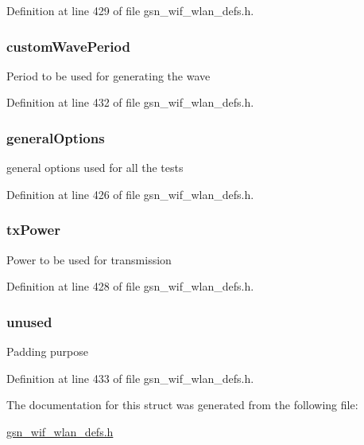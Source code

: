 Definition at line 429 of file gsn\_\-wif\_\-wlan\_\-defs.h.

\hypertarget{a00185_ac31de4bff9a4d75b56974c870ee58fd5}{
\subsubsection[{customWavePeriod}]{ {\bf customWavePeriod}}}
\label{a00185_ac31de4bff9a4d75b56974c870ee58fd5}
Period to be used for generating the wave 

Definition at line 432 of file gsn\_\-wif\_\-wlan\_\-defs.h.

\hypertarget{a00185_a5e4e9e8d2b76fbb6bdf201c4aeddd60d}{
\subsubsection[{generalOptions}]{ {\bf generalOptions}}}
\label{a00185_a5e4e9e8d2b76fbb6bdf201c4aeddd60d}
general options used for all the tests 

Definition at line 426 of file gsn\_\-wif\_\-wlan\_\-defs.h.

\hypertarget{a00185_a763a8a049f451428e05835d3c3b466cd}{
\subsubsection[{txPower}]{ {\bf txPower}}}
\label{a00185_a763a8a049f451428e05835d3c3b466cd}
Power to be used for transmission 

Definition at line 428 of file gsn\_\-wif\_\-wlan\_\-defs.h.

\hypertarget{a00185_a04efd61f68d1dcc6739211e703576ea7}{
\subsubsection[{unused}]{ {\bf unused}}}
\label{a00185_a04efd61f68d1dcc6739211e703576ea7}
Padding purpose 

Definition at line 433 of file gsn\_\-wif\_\-wlan\_\-defs.h.



The documentation for this struct was generated from the following file:\begin{DoxyCompactItemize}
\item 
\hyperlink{a00613}{gsn\_\-wif\_\-wlan\_\-defs.h}\end{DoxyCompactItemize}
